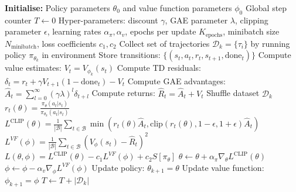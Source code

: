 \begin{algorithmic}
\State \textbf{Initialise:}
\State \quad Policy parameters $\theta_0$ and value function parameters $\phi_0$
\State \quad Global step counter $T \gets 0$
\State \quad Hyper-parameters: discount $\gamma$, GAE parameter $\lambda$, clipping parameter $\epsilon$, learning rates $\alpha_\pi, \alpha_v$, epochs per update $K_{\text{epochs}}$, minibatch size $N_{\text{minibatch}}$, loss coefficients $c_1, c_2$
    \State Collect set of trajectories $\mathcal{D}_k = \{\tau_i\}$ by running policy $\pi_{\theta_k}$ in environment
    \State Store transitions: $\{(s_t, a_t, r_t, s_{t+1}, \text{done}_t)\}$
        \State Compute value estimates: $V_t = V_{\phi_k}(s_t)$
        \State Compute TD residuals: $\delta_t = r_t + \gamma V_{t+1} (1 - \text{done}_t) - V_t$
        \State Compute GAE advantages: $\hat{A}_t = \sum_{l=0}^{\infty} (\gamma \lambda)^l \delta_{t+l}$
        \State Compute returns: $\hat{R}_t = \hat{A}_t + V_t$
    \EndFor
        \State Shuffle dataset $\mathcal{D}_k$
            \State $r_t(\theta) = \frac{\pi_\theta(a_t | s_t)}{\pi_{\theta_k}(a_t | s_t)}$
            \State $L^{\text{CLIP}}(\theta) = \frac{1}{|\mathcal{B}|} \sum_{t \in \mathcal{B}} \min\left(r_t(\theta) \hat{A}_t, \text{clip}(r_t(\theta), 1-\epsilon, 1+\epsilon) \hat{A}_t\right)$
            \State $L^{VF}(\phi) = \frac{1}{|\mathcal{B}|} \sum_{t \in \mathcal{B}} \left(V_\phi(s_t) - \hat{R}_t\right)^2$
            \State $L(\theta, \phi) = L^{\text{CLIP}}(\theta) - c_1 L^{VF}(\phi) + c_2 S[\pi_\theta]$
            \State $\theta \gets \theta + \alpha_\pi \nabla_\theta L^{\text{CLIP}}(\theta)$
            \State $\phi \gets \phi - \alpha_v \nabla_\phi L^{VF}(\phi)$
        \EndFor
    \EndFor
    \State Update policy: $\theta_{k+1} = \theta$
    \State Update value function: $\phi_{k+1} = \phi$
    \State $T \gets T + |\mathcal{D}_k|$
\EndFor
\end{algorithmic}

